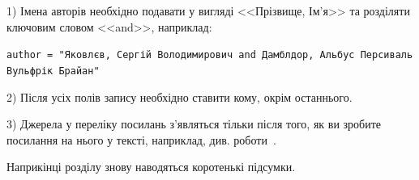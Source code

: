 1) Імена авторів необхідно подавати у вигляді <<Прізвище, Ім'я>> та
розділяти ключовим словом <<and>>, наприклад:

\texttt{author = "Яковлєв, Сергій Володимирович and Дамблдор, Альбус Персиваль Вульфрік Брайан"}

2) Після усіх полів запису необхідно ставити кому, окрім останнього.

3) Джерела у переліку посилань з'являться тільки після того, як ви зробите
посилання на нього у тексті, наприклад, див. роботи~\cite{ct1, ct2}.



\chapconclude{\ref{chap:theory}}

Наприкінці розділу знову наводяться коротенькі підсумки.
